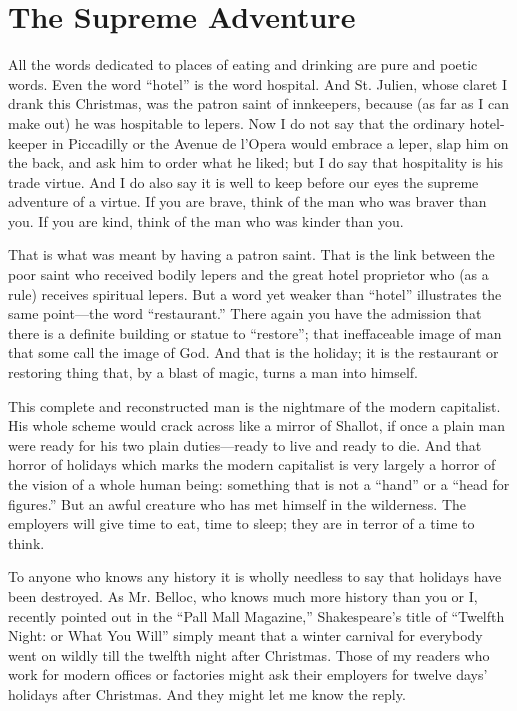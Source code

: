 \documentclass{book}
\begin{document}
\section{The Supreme Adventure}
All the words dedicated to places of eating and drinking are pure and poetic words. Even the word “hotel” is the word hospital. And St. Julien, whose claret I drank this Christmas, was the patron saint of innkeepers, because (as far as I can make out) he was hospitable to lepers. Now I do not say that the ordinary hotel-keeper in Piccadilly or the Avenue de l’Opera would embrace a leper, slap him on the back, and ask him to order what he liked; but I do say that hospitality is his trade virtue. And I do also say it is well to keep before our eyes the supreme adventure of a virtue. If you are brave, think of the man who was braver than you. If you are kind, think of the man who was kinder than you.

That is what was meant by having a patron saint. That is the link between the poor saint who received bodily lepers and the great hotel proprietor who (as a rule) receives spiritual lepers. But a word yet weaker than “hotel” illustrates the same point—the word “restaurant.” There again you have the admission that there is a definite building or statue to “restore”; that ineffaceable image of man that some call the image of God. And that is the holiday; it is the restaurant or restoring thing that, by a blast of magic, turns a man into himself.

This complete and reconstructed man is the nightmare of the modern capitalist. His whole scheme would crack across like a mirror of Shallot, if once a plain man were ready for his two plain duties—ready to live and ready to die. And that horror of holidays which marks the modern capitalist is very largely a horror of the vision of a whole human being: something that is not a “hand” or a “head for figures.” But an awful creature who has met himself in the wilderness. The employers will give time to eat, time to sleep; they are in terror of a time to think.

To anyone who knows any history it is wholly needless to say that holidays have been destroyed. As Mr. Belloc, who knows much more history than you or I, recently pointed out in the “Pall Mall Magazine,” Shakespeare’s title of “Twelfth Night: or What You Will” simply meant that a winter carnival for everybody went on wildly till the twelfth night after Christmas. Those of my readers who work for modern offices or factories might ask their employers for twelve days’ holidays after Christmas. And they might let me know the reply.
\end{document}
